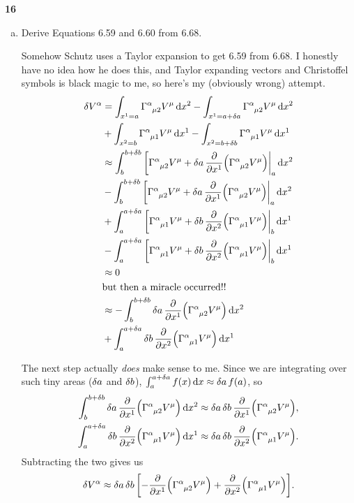 \documentclass[gr-notes.tex]{subfiles}
\begin{document}
\textbf{16}
\begin{enumerate}[(a)]
\item Derive Equations 6.59 and 6.60 from 6.68.

Somehow Schutz uses a Taylor expansion to get 6.59 from 6.68. I honestly have no idea how he does this, and Taylor expanding vectors and Christoffel symbols is black magic to me, so here's my (obviously wrong) attempt.
%
\begin{align*}
  \var{V^\alpha} &=
  \int_{x^1=a} \tensor{\Gamma}{^\alpha_{\mu 2}} V^\mu \dd{x^2} -
  \int_{x^1=a+\var{a}} \tensor{\Gamma}{^\alpha_{\mu 2}} V^\mu \dd{x^2}
  \\ &+
  \int_{x^2=b} \tensor{\Gamma}{^\alpha_{\mu 1}} V^\mu \dd{x^1} -
  \int_{x^2=b+\var{b}} \tensor{\Gamma}{^\alpha_{\mu 1}} V^\mu \dd{x^1}
  \\ &\approx
  \int_b^{b+\var{b}} \eval[
    \tensor{\Gamma}{^\alpha_{\mu 2}} V^\mu +
    \var{a} \pdv{x^1} \qty(\tensor{\Gamma}{^\alpha_{\mu 2}} V^\mu)
  |_a \dd{x^2}
  \\ &-
  \int_b^{b+\var{b}} \eval[
    \tensor{\Gamma}{^\alpha_{\mu 2}} V^\mu +
    \var{a} \pdv{x^1} \qty(\tensor{\Gamma}{^\alpha_{\mu 2}} V^\mu)
  |_a \dd{x^2}
  \\ &+
  \int_a^{a+\var{a}} \eval[
    \tensor{\Gamma}{^\alpha_{\mu 1}} V^\mu +
    \var{b} \pdv{x^2} \qty(\tensor{\Gamma}{^\alpha_{\mu 1}} V^\mu)
  |_b \dd{x^1}
  \\ &-
  \int_a^{a+\var{a}} \eval[
    \tensor{\Gamma}{^\alpha_{\mu 1}} V^\mu +
    \var{b} \pdv{x^2} \qty(\tensor{\Gamma}{^\alpha_{\mu 1}} V^\mu)
  |_b \dd{x^1}
  \\ &\approx
  0
  \\ &
  \text{but then a miracle occurred!!}
  \\ &\approx
 -\int_b^{b+\var{b}}
  \var{a} \pdv{x^1} \qty(\tensor{\Gamma}{^\alpha_{\mu 2}} V^\mu) \dd{x^2}
  \\ &+
  \int_a^{a+\var{a}}
  \var{b} \pdv{x^2} \qty(\tensor{\Gamma}{^\alpha_{\mu 1}} V^\mu) \dd{x^1}
\end{align*}

The next step actually \emph{does} make sense to me. Since we are integrating over such tiny areas ($\var{a}$ and $\var{b}$),
$\int_a^{a+\var{a}} f(x) \dd{x} \approx \var{a} f(a)$, so
%
\begin{align*}
  \int_b^{b+\var{b}}
  \var{a} \pdv{x^1} \qty(\tensor{\Gamma}{^\alpha_{\mu 2}} V^\mu) \dd{x^2}
  &\approx
  \var{a} \var{b} \pdv{x^1} \qty(\tensor{\Gamma}{^\alpha_{\mu 2}} V^\mu),
  \\
  \int_a^{a+\var{a}}
  \var{b} \pdv{x^2} \qty(\tensor{\Gamma}{^\alpha_{\mu 1}} V^\mu) \dd{x^1}
  &\approx
  \var{a} \var{b} \pdv{x^2} \qty(\tensor{\Gamma}{^\alpha_{\mu 1}} V^\mu).
\end{align*}
%
Subtracting the two gives us
%
\begin{displaymath}
  \var{V^\alpha} \approx
  \var{a} \var{b} \qty[
   -\pdv{x^1} \qty(\tensor{\Gamma}{^\alpha_{\mu 2}} V^\mu) +
    \pdv{x^2} \qty(\tensor{\Gamma}{^\alpha_{\mu 1}} V^\mu)
  ].
\end{displaymath}



\end{enumerate}
\end{document}
